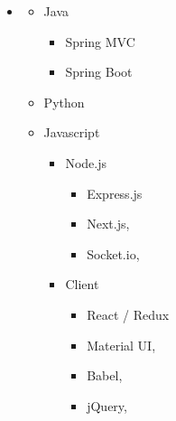 \documentclass[10pt,a4paper,sans]{moderncv} %
\begin{document}
	\begin{itemize}
		\item[]
		\begin{multicols}{2}
			\begin{itemize}
				\item Java
				\begin{itemize}
					\item Spring MVC
					\item Spring Boot
				\end{itemize}
				\item Python
				\item Javascript
				\begin{itemize}
					\item Node.js
					\begin{itemize}
						\item Express.js
						\item Next.js,
						\item Socket.io,
					\end{itemize}
					\item Client
					\begin{itemize}
						\item React / Redux
						\item Material UI,
						\item Babel,
						\item jQuery,
					\end{itemize}
				\end{itemize}
			\end{itemize}
			
			\columnbreak


\end{multicols}
\end{itemize}
\end{document}
